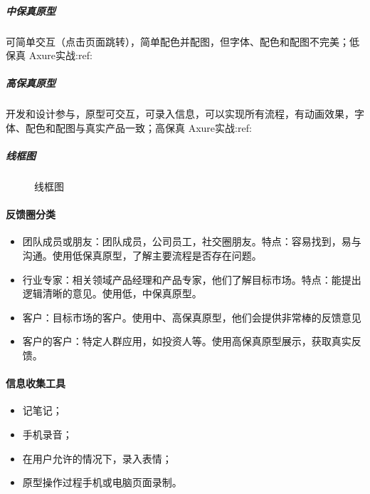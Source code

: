 \documentclass[letterpaper,10pt,english]{sphinxmanual}
\begin{document}
\subparagraph{中保真原型}
\label{\detokenize{chapter_knowledge/prototype_design:id8}}
可简单交互（点击页面跳转），简单配色并配图，但字体、配色和配图不完美；低保真
Axure实战:ref:


\subparagraph{高保真原型}
\label{\detokenize{chapter_knowledge/prototype_design:id9}}
开发和设计参与，原型可交互，可录入信息，可以实现所有流程，有动画效果，字体、配色和配图与真实产品一致；高保真
Axure实战:ref:


\subparagraph{线框图}
\label{\detokenize{chapter_knowledge/prototype_design:id10}}
\begin{figure}[H]
\centering
\capstart

\noindent{}
\caption{线框图\sphinxfootnotemark[614]}\label{\detokenize{chapter_knowledge/prototype_design:id22}}\end{figure}
%
\begin{footnotetext}[614]\sphinxAtStartFootnote
{}
%
\end{footnotetext}\ignorespaces 

\paragraph{反馈圈分类}
\label{\detokenize{chapter_knowledge/prototype_design:id11}}\begin{itemize}
\item {} 
团队成员或朋友：团队成员，公司员工，社交圈朋友。特点：容易找到，易与沟通。使用低保真原型，了解主要流程是否存在问题。

\item {} 
行业专家：相关领域产品经理和产品专家，他们了解目标市场。特点：能提出逻辑清晰的意见。使用低，中保真原型。

\item {} 
客户：目标市场的客户。使用中、高保真原型，他们会提供非常棒的反馈意见

\item {} 
客户的客户：特定人群应用，如投资人等。使用高保真原型展示，获取真实反馈。

\end{itemize}


\paragraph{信息收集工具}
\label{\detokenize{chapter_knowledge/prototype_design:id12}}\begin{itemize}
\item {} 
记笔记；

\item {} 
手机录音；

\item {} 
在用户允许的情况下，录入表情；

\item {} 
原型操作过程手机或电脑页面录制。

\end{itemize}
\end{document}
